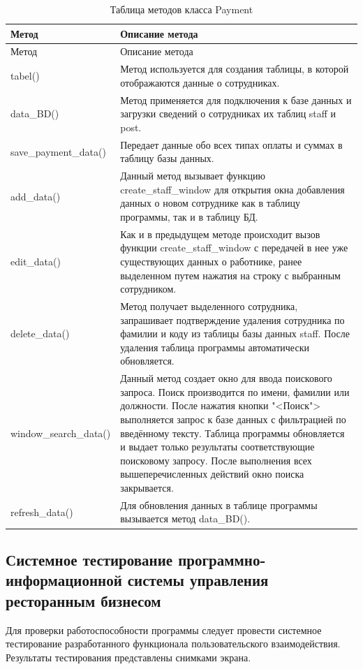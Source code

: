\begin{xltabular}{\textwidth}{|p{6cm}|X|}
	\caption{Таблица методов класса Payment\label{class:table_class_staff}} \hline
	\centrow Метод & \centrow Описание метода \\ \hline
	\endfirsthead
	\centrow Метод & \centrow Описание метода \\ \hline
	\finishhead
	tabel() & Метод используется для создания таблицы, в которой отображаются данные о сотрудниках.\\ \hline
	data\_BD() & Метод применяется для подключения к базе данных и загрузки сведений о сотрудниках их таблиц staff и post. \\ \hline 
	save\_payment\_data() & Передает данные обо всех типах оплаты и суммах в таблицу базы данных. \\ \hline 
	add\_data() & Данный метод вызывает функцию create\_staff\_window для открытия окна добавления данных о новом сотруднике как в таблицу программы, так и в таблицу БД.  \\ \hline 
	edit\_data() & Как и в предыдущем методе происходит вызов функции create\_staff\_window  с передачей в нее уже существующих данных о работнике, ранее выделенном путем нажатия на строку с выбранным сотрудником. \\ \hline
	delete\_data() & Метод получает выделенного сотрудника, запрашивает подтверждение удаления сотрудника по фамилии и коду из таблицы базы данных staff. После удаления таблица программы автоматически обновляется. \\ \hline
	window\_search\_data() & Данный метод создает окно для ввода поискового запроса. Поиск производится по имени, фамилии или должности. После нажатия кнопки "<Поиск"> выполняется запрос к базе данных с фильтрацией по введённому тексту. Таблица программы обновляется и выдает только результаты соответствующие поисковому запросу. После выполнения всех вышеперечисленных действий окно поиска закрывается.  \\ \hline
	refresh\_data() & Для обновления данных в таблице программы вызывается метод data\_BD().
	
\end{xltabular}

\subsection{Системное тестирование программно-информационной системы управления ресторанным бизнесом}
Для проверки работоспособности программы следует провести системное тестирование разработанного функционала пользовательского взаимодействия. Результаты тестирования представлены снимками экрана. 

